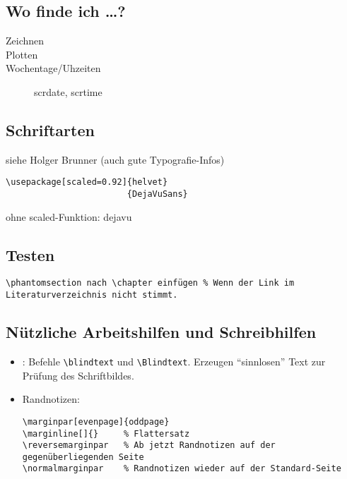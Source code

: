 
	

	
 		
			

	

\subsection{Wo finde ich \dots?}
\begin{description}
	\item[Zeichnen]
	\item[Plotten]
	\item[Wochentage/Uhzeiten] scrdate, scrtime 
\end{description}

\subsection{Schriftarten}
siehe Holger Brunner (auch gute Typografie-Infos)
\begin{lstlisting}
\usepackage[scaled=0.92]{helvet}
                        {DejaVuSans}
\end{lstlisting}
ohne scaled-Funktion: dejavu

\subsection{Testen}
\lstinline{\phantomsection nach \chapter einfügen % Wenn der Link im Literaturverzeichnis nicht stimmt.}

\subsection{Nützliche Arbeitshilfen und Schreibhilfen}
\begin{itemize}
	\item {}: Befehle \lstinline|\blindtext| und \lstinline|\Blindtext|. Erzeugen "`sinnlosen"' Text zur Prüfung des Schriftbildes.
	\item Randnotizen: 
	\begin{lstlisting}
\marginpar[evenpage]{oddpage} 
\marginline[]{} 	% Flattersatz
\reversemarginpar 	% Ab jetzt Randnotizen auf der gegenüberliegenden Seite
\normalmarginpar 	% Randnotizen wieder auf der Standard-Seite
\end{lstlisting}
\end{itemize}

